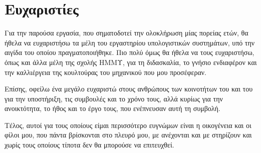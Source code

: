 \chapter*{Ευχαριστίες}
Για την παρούσα εργασία, που σηματοδοτεί την ολοκλήρωση μίας πορείας ετών, θα
ήθελα να ευχαριστήσω τα μέλη του εργαστηρίου υπολογιστικών συστημάτων, υπό την
αιγίδα του οποίου πραγματοποιήθηκε. Πιο πολύ όμως θα ήθελα να τους ευχαριστήσω,
όπως και άλλα μέλη της σχολής ΗΜΜΥ, για τη διδασκαλία, το γνήσιο ενδιαφέρον και
την καλλιέργεια της κουλτούρας του μηχανικού που μου προσέφεραν.

Επίσης, οφείλω ένα μεγάλο ευχαριστώ στους ανθρώπους των κοινοτήτων του 
και του  για την υποστήριξη, τις συμβουλές και το χρόνο τους, αλλά
κυρίως για την ανοικτότητα, το ήθος και το έργο τους, που ενέπνευσαν αυτή τη
συμβολή.

Τέλος, αυτοί για τους οποίους είμαι περισσότερο ευγνώμων είναι η οικογένεια και
οι φίλοι μου, που πάντα βρίσκονται στο πλευρό μου, με ανέχονται και με στηρίζουν
και χωρίς τους οποίους τίποτα δεν θα μπορούσε να επιτευχθεί.

